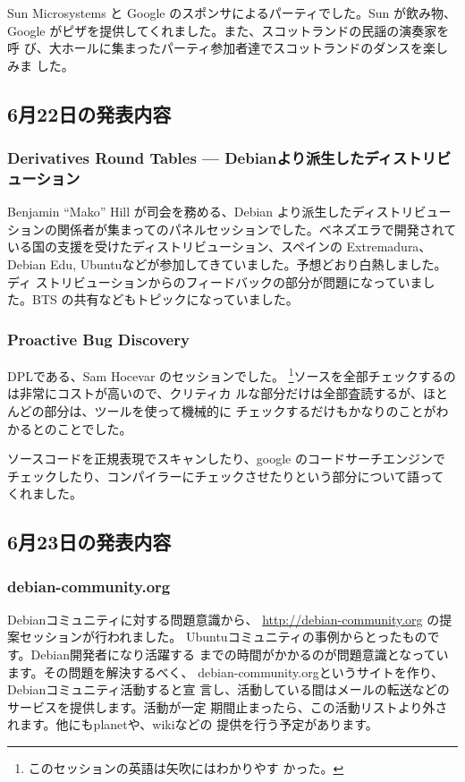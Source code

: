 \documentclass[mingoth,a4paper]{jsarticle}
\begin{document}
Sun Microsystems と Google のスポンサによるパーティでした。Sun が飲み物、
Google がピザを提供してくれました。また、スコットランドの民謡の演奏家を呼
び、大ホールに集まったパーティ参加者達でスコットランドのダンスを楽しみま
した。

\subsection{6月22日の発表内容}

\subsubsection{Derivatives Round Tables --- Debianより派生したディストリビューション}

Benjamin ``Mako'' Hill が司会を務める、Debian より派生したディストリビュー
ションの関係者が集まってのパネルセッションでした。ベネズエラで開発されて
いる国の支援を受けたディストリビューション、スペインの Extremadura、
Debian Edu, Ubuntuなどが参加してきていました。予想どおり白熱しました。ディ
ストリビューションからのフィードバックの部分が問題になっていました。BTS 
の共有などもトピックになっていました。

\subsubsection{Proactive Bug Discovery}

  DPLである、Sam Hocevar のセッションでした。
\footnote{このセッションの英語は矢吹にはわかりやす
  かった。}ソースを全部チェックするのは非常にコストが高いので、クリティカ
  ルな部分だけは全部査読するが、ほとんどの部分は、ツールを使って機械的に
  チェックするだけもかなりのことがわかるとのことでした。

ソースコードを正規表現でスキャンしたり、google のコードサーチエンジンで
  チェックしたり、コンパイラーにチェックさせたりという部分について語って
  くれました。

\subsection{6月23日の発表内容}

\subsubsection{debian-community.org}

  Debianコミュニティに対する問題意識から、
  \url{http://debian-community.org} の提案セッションが行われました。
  Ubuntuコミュニティの事例からとったものです。Debian開発者になり活躍する
  までの時間がかかるのが問題意識となっています。その問題を解決するべく、
  debian-community.orgというサイトを作り、Debianコミュニティ活動すると宣
  言し、活動している間はメールの転送などのサービスを提供します。活動が一定
  期間止まったら、この活動リストより外されます。他にもplanetや、wikiなどの
  提供を行う予定があります。
\end{document}
